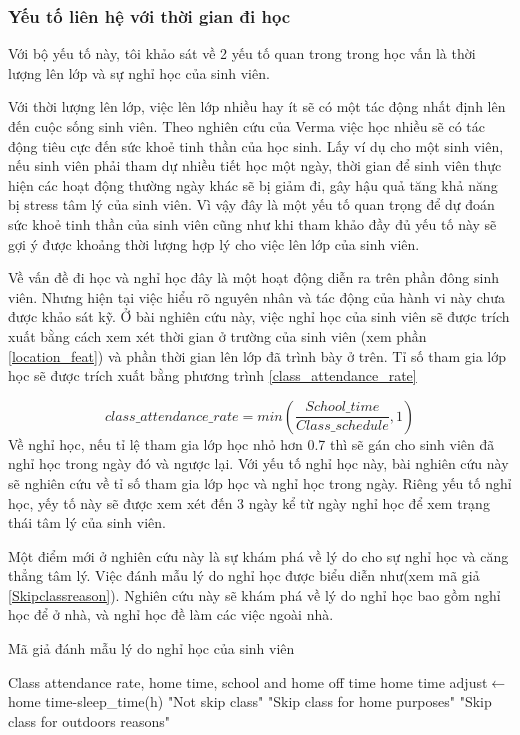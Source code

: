\subsubsection{Yếu tố liên hệ với thời gian đi học} \label{time_on_school_related_feature}
Với bộ yếu tố này, tôi khảo sát về 2 yếu tố quan trong trong học vấn là thời lượng lên lớp và sự nghỉ học của sinh viên.

Với thời lượng lên lớp, việc lên lớp nhiều hay ít sẽ có một tác động nhất định lên đến cuộc sống sinh viên. Theo nghiên cứu của Verma \cite{school_time_and_stress} việc học nhiều sẽ có tác động tiêu cực đến sức khoẻ tinh thần của học sinh. Lấy ví dụ cho một sinh viên, nếu sinh viên phải tham dự nhiều tiết học một ngày, thời gian để sinh viên thực hiện các hoạt động thường ngày khác sẽ bị giảm đi, gây hậu quả tăng khả năng bị stress tâm lý của sinh viên. Vì vậy đây là một yếu tố quan trọng để dự đoán sức khoẻ tinh thần của sinh viên cũng như khi tham khảo đầy đủ yếu tố này sẽ gợi ý được khoảng thời lượng hợp lý cho việc lên lớp của sinh viên.

Về vấn đề đi học và nghỉ học đây là một hoạt động diễn ra trên phần đông sinh viên. Nhưng hiện tại việc hiểu rõ nguyên nhân và tác động của hành vi này chưa được khảo sát kỹ. Ở bài nghiên cứu này, việc nghỉ học của sinh viên sẽ được trích xuất bằng cách xem xét thời gian ở trường của sinh viên (xem phần \ref{location_feat}) và phần thời gian lên lớp đã trình bày ở trên. Tỉ số tham gia lớp học sẽ được trích xuất bằng phương trình \eqref{class_attendance_rate}


\begin{equation}
    class\_attendance\_rate=min(\frac{School\_time}{Class\_schedule},1)
    \label{class_attendance_rate}
\end{equation}
Về nghỉ học, nếu tỉ lệ tham gia lớp học nhỏ hơn 0.7 thì sẽ gán cho sinh viên đã nghỉ học trong ngày đó và ngược lại. Với yếu tố nghỉ học này, bài nghiên cứu này sẽ nghiên cứu về tỉ số tham gia lớp học và nghỉ học trong ngày. Riêng yếu tố nghỉ học, yếy tố này sẽ được xem xét đến 3 ngày kể từ ngày nghỉ học để xem trạng thái tâm lý của sinh viên.

Một điểm mới ở nghiên cứu này là sự khám phá về lý do cho sự nghỉ học và căng thẳng tâm lý. Việc đánh mẫu lý do nghỉ học được biểu diễn như(xem mã giả \ref{Skipclassreason}). Nghiên cứu này sẽ khám phá về lý do nghỉ học bao gồm nghỉ học để ở nhà, và nghỉ học đề làm các việc ngoài nhà.

\begin{algorithm}
\fontsize{13}{16}
\selectfont
\caption{Mã giả đánh mẫu lý do nghỉ học của sinh viên}
\label{Skipclassreason}
\begin{algorithmic}
\Require Class attendance rate, home time, school and home off time
\State home time adjust$\gets$ home time-sleep\_time(h)
\State \Return "Not skip class"
\State \Return "Skip class for home purposes"
\Else
\State \Return "Skip class for outdoors reasons"
\EndIf

\end{algorithmic}
\end{algorithm}

